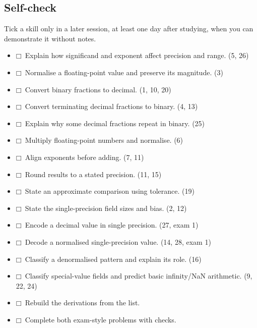 \documentclass[11pt]{article}
\begin{document}
\begin{keepsection}
\section{Self-check}

Tick a skill only in a later session, at least one day after studying, when you can demonstrate it without notes.

\begin{itemize}
\item $\mdlgwhtsquare$\ Explain how significand and exponent affect precision and range. (5, 26)
\item $\mdlgwhtsquare$\ Normalise a floating-point value and preserve its magnitude. (3)
\item $\mdlgwhtsquare$\ Convert binary fractions to decimal. (1, 10, 20)
\item $\mdlgwhtsquare$\ Convert terminating decimal fractions to binary. (4, 13)
\item $\mdlgwhtsquare$\ Explain why some decimal fractions repeat in binary. (25)
\item $\mdlgwhtsquare$\ Multiply floating-point numbers and normalise. (6)
\item $\mdlgwhtsquare$\ Align exponents before adding. (7, 11)
\item $\mdlgwhtsquare$\ Round results to a stated precision. (11, 15)
\item $\mdlgwhtsquare$\ State an approximate comparison using tolerance. (19)
\item $\mdlgwhtsquare$\ State the single-precision field sizes and bias. (2, 12)
\item $\mdlgwhtsquare$\ Encode a decimal value in single precision. (27, exam 1)
\item $\mdlgwhtsquare$\ Decode a normalised single-precision value. (14, 28, exam 1)
\item $\mdlgwhtsquare$\ Classify a denormalised pattern and explain its role. (16)
\item $\mdlgwhtsquare$\ Classify special-value fields and predict basic infinity/NaN arithmetic. (9, 22, 24)
\item $\mdlgwhtsquare$\ Rebuild the derivations from the list.
\item $\mdlgwhtsquare$\ Complete both exam-style problems with checks.
\end{itemize}
\end{keepsection}
\end{document}
